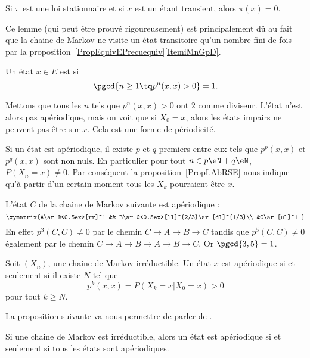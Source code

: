 \begin{lemma}
	Si \( \pi\) est une loi stationnaire et si \( x\) est un étant transient, alors \( \pi(x)=0\).
\end{lemma}
Ce lemme (qui peut être prouvé rigoureusement) est principalement dû au fait que la chaine de Markov ne visite un état transitoire qu'un nombre fini de fois par la proposition~\ref{PropEquivEPrecuequiv}\ref{ItemiMnGpD}.

\begin{definition}  \label{DefCxvOaT}
	Un état \( x\in E\) est  si
	\begin{equation}
		\pgcd\{ n\geq 1\tq p^n(x,x)>0 \}=1.
	\end{equation}
\end{definition}
Mettons que tous les \( n\) tels que \( p^n(x,x)>0\) ont \( 2\) comme diviseur. L'état n'est alors pas apériodique, mais on voit que si \( X_0=x\), alors les états impairs ne peuvent pas être sur \( x\). Cela est une forme de périodicité.

Si un état est apériodique, il existe \( p\) et \( q\) premiers entre eux tels que \( p^p(x,x)\) et \( p^q(x,x)\) sont non nuls. En particulier pour tout \( n\in p\eN+q\eN\), \( P(X_n=x)\neq 0\). Par conséquent la proposition~\ref{PropLAbRSE} nous indique qu'à partir d'un certain moment tous les \( X_k\) pourraient être \( x\).

L'état \( C\) de la chaine de Markov suivante est apériodique :
\begin{equation}
	\xymatrix{%
		A\ar@<0.5ex>[rr]^1  && B\ar@<0.5ex>[ll]^{2/3}\ar[dl]^{1/3}\\
		&C\ar[ul]^1
	}
\end{equation}
En effet \( p^3(C,C)\neq 0\) par le chemin \( C\to A\to B\to C\) tandis que \( p^5(C,C)\neq 0\) également par le chemin \( C\to A\to B\to A\to B\to C\). Or \( \pgcd\{ 3,5 \}=1\).

\begin{proposition}     \label{PropSaOysS}
	Soit \( (X_n)\), une chaine de Markov irréductible. Un état \( x\) est apériodique si et seulement si il existe \( N\) tel que
	\begin{equation}
		p^k(x,x)=P(X_k=x|X_0=x)>0
	\end{equation}
	pour tout \( k\geq N\).
\end{proposition}

La proposition suivante va nous permettre de parler de 
.
\begin{proposition}
	Si une chaine de Markov est irréductible, alors un état est apériodique si et seulement si tous les états sont apériodiques.
\end{proposition}

